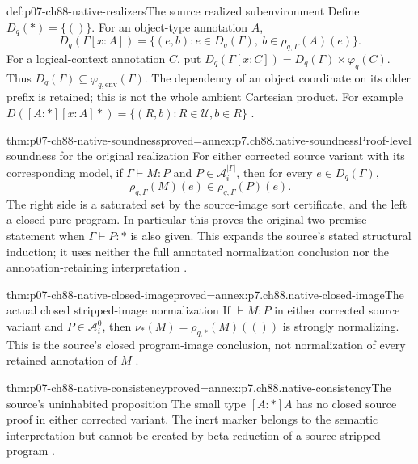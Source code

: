 \begin{hbdefinition}{def:p07-ch88-native-realizers}{The source realized subenvironment}
Define \(D_q(\ast)=\{()\}\). For an object-type annotation \(A\),
\[
 D_q(\Gamma[x:A])=
 \{(e,b):e\in D_q(\Gamma),\ b\in\rho_{q,\Gamma}(A)(e)\}.
\]
For a logical-context annotation \(C\), put
\(D_q(\Gamma[x:C])=D_q(\Gamma)\times\varphi_q(C)\).
Thus \(D_q(\Gamma)\subseteq\varphi_{q,\mathrm{env}}(\Gamma)\).
The dependency of an object coordinate on its older prefix is retained;
this is not the whole ambient Cartesian product. For example
\(D([A:\ast][x:A]\ast)=\{(R,b):R\in\mathcal U, b\in R\}\)
\cite[\S5.3, p.~109]{CoquandHuet1988}.
\end{hbdefinition}

\begin{hbtheorem}{thm:p07-ch88-native-soundness}{proved=annex:p7.ch88.native-soundness}{Proof-level soundness for the original realization}
For either corrected source variant with its corresponding model, if
\(\Gamma\vdash M:P\) and \(P\in\mathcal A_i^{|\Gamma|}\),
then for every \(e\in D_q(\Gamma)\),
\[
 \rho_{q,\Gamma}(M)(e)\in\rho_{q,\Gamma}(P)(e).
\]
The right side is a saturated set by the source-image sort certificate,
and the left a closed pure program. In particular this proves the original
two-premise statement when \(\Gamma\vdash P:\ast\) is also given.
This expands the source's stated structural induction; it uses neither
the full annotated normalization conclusion nor the annotation-retaining
interpretation \cite[\S5.4, p.~109]{CoquandHuet1988}.
\end{hbtheorem}

\begin{hbcorollary}{thm:p07-ch88-native-closed-image}{proved=annex:p7.ch88.native-closed-image}{The actual closed stripped-image normalization}
\label{thm:p07-ch88-source-stripped-normalization}
If \(\vdash M:P\) in either corrected source variant and
\(P\in\mathcal A_i^0\), then
\(\nu_\ast(M)=\rho_{q,\ast}(M)(())\) is strongly normalizing.
This is the source's closed program-image conclusion, not normalization
of every retained annotation of \(M\) \cite[p.~110]{CoquandHuet1988}.
\end{hbcorollary}

\begin{hbtheorem}{thm:p07-ch88-native-consistency}{proved=annex:p7.ch88.native-consistency}{The source's uninhabited proposition}
The small type \([A:\ast]A\) has no closed source proof in either
corrected variant. The inert marker belongs to the semantic interpretation
but cannot be created by beta reduction of a source-stripped program
\cite[Corollary~2, p.~110]{CoquandHuet1988}.
\end{hbtheorem}
